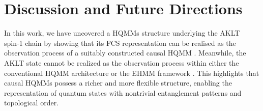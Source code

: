 \documentclass[11pt,a4paper]{article}
\begin{document}



\section{Discussion and Future Directions}\label{sect-Disc}
In this work, we have uncovered a HQMMs structure underlying the AKLT spin‑1 chain by showing that its FCS representation can be realised as the observation process of a suitably constructed causal HQMM  \cite{SouBarhqmm2026}. Meanwhile, the AKLT state cannot be realized as the observation process within either the conventional HQMM architecture \cite{SA26} or the EHMM framework \cite{Sou25}. This highlights that causal HQMMs possess a richer and more flexible structure, enabling the representation of quantum states with nontrivial entanglement patterns and topological order.
\end{document}
